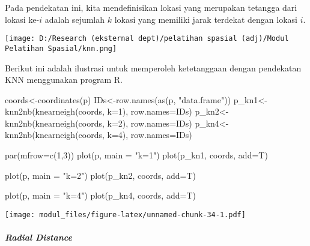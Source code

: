 \documentclass[
]{book}
\newenvironment{Shaded}{\begin{snugshade}}{\end{snugshade}}
\newcommand{\AttributeTok}[1]{\textcolor[rgb]{0.77,0.63,0.00}{#1}}
\newcommand{\DecValTok}[1]{\textcolor[rgb]{0.00,0.00,0.81}{#1}}
\newcommand{\FunctionTok}[1]{\textcolor[rgb]{0.00,0.00,0.00}{#1}}
\newcommand{\NormalTok}[1]{#1}
\newcommand{\OtherTok}[1]{\textcolor[rgb]{0.56,0.35,0.01}{#1}}
\newcommand{\StringTok}[1]{\textcolor[rgb]{0.31,0.60,0.02}{#1}}
\begin{document}
Pada pendekatan ini, kita mendefinisikan lokasi yang merupakan tetangga dari lokasi ke-\(i\) adalah sejumlah \(k\) lokasi yang memiliki jarak terdekat dengan lokasi \(i\).

\texttt{[image: D:/Research (eksternal dept)/pelatihan spasial (adj)/Modul Pelatihan Spasial/knn.png]}

Berikut ini adalah ilustrasi untuk memperoleh ketetanggaan dengan pendekatan KNN menggunakan program R.

\begin{Shaded}
\begin{Highlighting}[]
\NormalTok{coords}\OtherTok{\textless{}{-}}\FunctionTok{coordinates}\NormalTok{(p)}
\NormalTok{IDs}\OtherTok{\textless{}{-}}\FunctionTok{row.names}\NormalTok{(}\FunctionTok{as}\NormalTok{(p, }\StringTok{"data.frame"}\NormalTok{))}
\NormalTok{p\_kn1}\OtherTok{\textless{}{-}}\FunctionTok{knn2nb}\NormalTok{(}\FunctionTok{knearneigh}\NormalTok{(coords, }\AttributeTok{k=}\DecValTok{1}\NormalTok{), }\AttributeTok{row.names=}\NormalTok{IDs)}
\NormalTok{p\_kn2}\OtherTok{\textless{}{-}}\FunctionTok{knn2nb}\NormalTok{(}\FunctionTok{knearneigh}\NormalTok{(coords, }\AttributeTok{k=}\DecValTok{2}\NormalTok{), }\AttributeTok{row.names=}\NormalTok{IDs)}
\NormalTok{p\_kn4}\OtherTok{\textless{}{-}}\FunctionTok{knn2nb}\NormalTok{(}\FunctionTok{knearneigh}\NormalTok{(coords, }\AttributeTok{k=}\DecValTok{4}\NormalTok{), }\AttributeTok{row.names=}\NormalTok{IDs)}

\FunctionTok{par}\NormalTok{(}\AttributeTok{mfrow=}\FunctionTok{c}\NormalTok{(}\DecValTok{1}\NormalTok{,}\DecValTok{3}\NormalTok{))}
\FunctionTok{plot}\NormalTok{(p, }\AttributeTok{main =} \StringTok{"k=1"}\NormalTok{)}
\FunctionTok{plot}\NormalTok{(p\_kn1, coords, }\AttributeTok{add=}\NormalTok{T)}

\FunctionTok{plot}\NormalTok{(p, }\AttributeTok{main =} \StringTok{"k=2"}\NormalTok{)}
\FunctionTok{plot}\NormalTok{(p\_kn2, coords, }\AttributeTok{add=}\NormalTok{T)}

\FunctionTok{plot}\NormalTok{(p, }\AttributeTok{main =} \StringTok{"k=4"}\NormalTok{)}
\FunctionTok{plot}\NormalTok{(p\_kn4, coords, }\AttributeTok{add=}\NormalTok{T)}
\end{Highlighting}
\end{Shaded}

\texttt{[image: modul\_files/figure-latex/unnamed-chunk-34-1.pdf]}

\hypertarget{radial-distance}{%
\paragraph{\texorpdfstring{\emph{Radial Distance}}{Radial Distance}}\label{radial-distance}}
\end{document}
